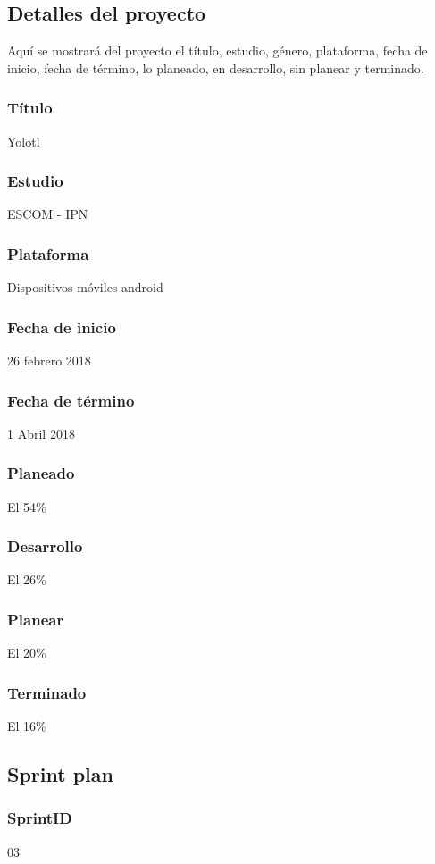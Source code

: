 \subsection{Detalles del proyecto}
Aquí se mostrará del proyecto el título, estudio, género, plataforma, fecha de inicio, fecha de término, lo planeado, en desarrollo, sin planear y terminado.
\\
\subsubsection{Título}
Yolotl

\subsubsection{Estudio}
ESCOM - IPN

\subsubsection{Plataforma}
Dispositivos móviles android

\subsubsection{Fecha de inicio}
26 febrero 2018
\subsubsection{Fecha de término}
1 Abril 2018
\subsubsection{Planeado}
El 54\%
\subsubsection{Desarrollo}
El 26\%
\subsubsection{Planear}
El 20\%
\subsubsection{Terminado}
El 16\%



\subsection{Sprint plan}
\subsubsection{SprintID}
03

